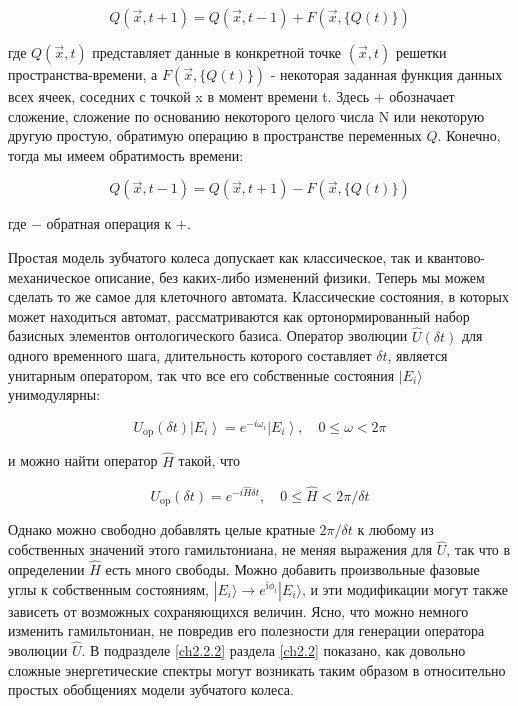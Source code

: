 \documentclass[main.tex]{subfiles}
\begin{document}
\begin{equation}\label{5.2}
	Q(\vec{x}, t+1)=Q(\vec{x}, t-1)+F(\vec{x},\{Q(t)\})
\end{equation}

где $Q(\vec{x}, t)$ представляет данные в конкретной точке $(\vec{x}, t)$ решетки пространства-времени, а $F(\vec{x},\{Q(t)\})$ - некоторая заданная функция данных всех ячеек, соседних с точкой x в момент времени t. Здесь $+$ обозначает сложение, сложение по основанию некоторого целого числа N или некоторую другую простую, обратимую операцию в пространстве переменных $Q$. Конечно, тогда мы имеем обратимость времени:             


\begin{equation}\label{5.3}
	Q(\vec{x}, t-1)=Q(\vec{x}, t+1)-F(\vec{x},\{Q(t)\})
\end{equation}
            
где $-$ обратная операция к $+$.

Простая модель зубчатого колеса допускает как классическое, так и квантово-механическое описание, без каких-либо изменений физики. Теперь мы можем сделать то же самое для клеточного автомата. Классические состояния, в которых может находиться автомат, рассматриваются как ортонормированный набор базисных элементов онтологического базиса. Оператор эволюции $\hat U(\delta t)$ для одного временного шага, длительность которого составляет $\delta t$, является унитарным оператором, так что все его собственные состояния $|E_i\rangle$ унимодулярны:

\begin{equation}\label{5.4}
	U_{\mathrm{op}}(\delta t)\left|E_{i}\right\rangle= e^{-i \omega_{i}}\left|E_{i}\right\rangle, \quad 0 \leq \omega<2 \pi
\end{equation}

и можно найти оператор $\hat H$ такой, что

\begin{equation}\label{5.5}
	U_{\mathrm{op}}(\delta t)= e^{-i \hat H \delta t}, \quad 0 \leq \hat H<2 \pi/\delta t
\end{equation}

Однако можно свободно добавлять целые кратные $2\pi / \delta t$ к любому из собственных значений этого гамильтониана, не меняя выражения для $\hat U$, так что в определении $\hat H$ есть много свободы. Можно добавить произвольные фазовые углы к собственным состояниям, $|E_i\rangle \rightarrow e^{\mathrm i \phi_i}|E_i\rangle$, и эти модификации могут также зависеть от возможных сохраняющихся величин. Ясно, что можно немного изменить гамильтониан, не повредив его полезности для генерации оператора эволюции $\hat U$. В подразделе \ref{ch2.2.2} раздела \ref{ch2.2} показано, как довольно сложные энергетические спектры могут возникать таким образом в относительно простых обобщениях модели зубчатого колеса.
\end{document}
